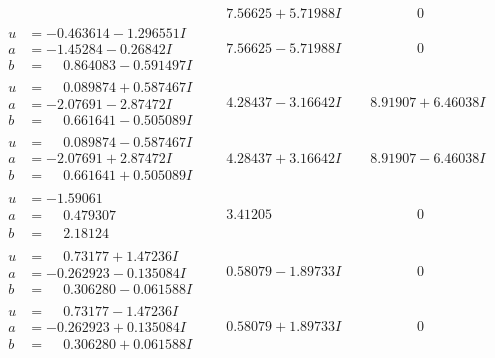 \documentclass[1p]{elsarticle_modified}
\theoremstyle{definition}
\begin{document}
$$\begin{array}{c|c|c}
 & \phantom{-}7.56625 + 5.71988 I & \phantom{-0.000000 } 0 \\ \hline\begin{aligned}
u &= -0.463614 - 1.296551 I \\
a &= -1.45284 - 0.26842 I \\
b &= \phantom{-}0.864083 - 0.591497 I\end{aligned}
 & \phantom{-}7.56625 - 5.71988 I & \phantom{-0.000000 } 0 \\ \hline\begin{aligned}
u &= \phantom{-}0.089874 + 0.587467 I \\
a &= -2.07691 - 2.87472 I \\
b &= \phantom{-}0.661641 - 0.505089 I\end{aligned}
 & \phantom{-}4.28437 - 3.16642 I & \phantom{-}8.91907 + 6.46038 I \\ \hline\begin{aligned}
u &= \phantom{-}0.089874 - 0.587467 I \\
a &= -2.07691 + 2.87472 I \\
b &= \phantom{-}0.661641 + 0.505089 I\end{aligned}
 & \phantom{-}4.28437 + 3.16642 I & \phantom{-}8.91907 - 6.46038 I \\ \hline\begin{aligned}
u &= -1.59061\phantom{ +0.000000I} \\
a &= \phantom{-}0.479307\phantom{ +0.000000I} \\
b &= \phantom{-}2.18124\phantom{ +0.000000I}\end{aligned}
 & \phantom{-}3.41205\phantom{ +0.000000I} & \phantom{-0.000000 } 0 \\ \hline\begin{aligned}
u &= \phantom{-}0.73177 + 1.47236 I \\
a &= -0.262923 - 0.135084 I \\
b &= \phantom{-}0.306280 - 0.061588 I\end{aligned}
 & \phantom{-}0.58079 - 1.89733 I & \phantom{-0.000000 } 0 \\ \hline\begin{aligned}
u &= \phantom{-}0.73177 - 1.47236 I \\
a &= -0.262923 + 0.135084 I \\
b &= \phantom{-}0.306280 + 0.061588 I\end{aligned}
 & \phantom{-}0.58079 + 1.89733 I & \phantom{-0.000000 } 0 \\ \hline\begin{aligned}

\end{aligned}
\end{array}$$
\end{document}
